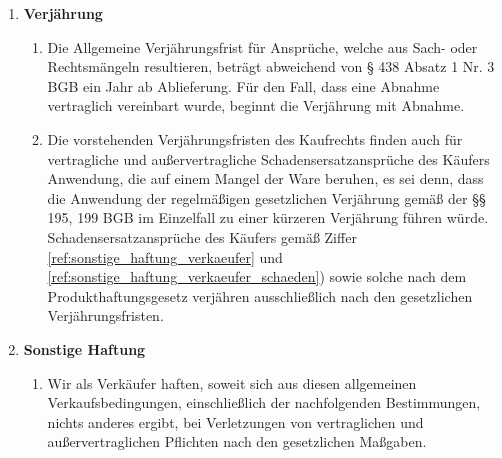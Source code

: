\documentclass[%
    a4paper,%
    10pt,
]{scrartcl}
\begin{document}
\begin{multicols}{2}
\begin{enumerate}
\begin{enumerate}
             \item Der Käufer kann nach den gesetzlichen Vorschriften vom Kaufvertrag zurücktreten oder den Kaufpreis mindern, wenn eine vom Käufer für die Nacherfüllung zu setzende Frist erfolglos abgelaufen ist oder nach den gesetzlichen Vorschriften entbehrlich ist. Für den Fall eines nicht erheblichen Mangels steht dem Käufer jedoch kein Rücktrittsrecht zu.
             \item Ansprüche des Käufers auf Aufwendungsersatz gemäß § 445a Absatz 1 BGB sind ausgeschlossen, es sei denn, dass es sich bei dem letzten Vertrag in der Lieferkette um einen Verbrauchsgüterkauf (§§ 478, 474 BGB) oder um einen Verbrauchervertrag über die Bereitstellung digitaler Produkte (§§ 445c Satz 2, 327 Absatz 5, 327u BGB) handelt.
             \item Schadensersatzansprüche oder Ansprüche auf Ersatz vergeblicher Aufwendungen des Käufers (§ 284 BGB) bestehen auch bei Vorliegen eines Mangels lediglich nach Maßgabe von Ziffer \ref{ref:verjaehrung} und Ziffer \ref{ref:sonstige_haftung}.
            \end{enumerate}
          \item \textbf{Verjährung} \label{ref:verjaehrung}%
            \begin{enumerate}
            \item Die Allgemeine Verjährungsfrist für Ansprüche, welche aus Sach- oder Rechtsmängeln resultieren, beträgt abweichend von § 438 Absatz 1 Nr. 3 BGB ein Jahr ab Ablieferung. Für den Fall, dass eine Abnahme vertraglich vereinbart wurde, beginnt die Verjährung mit Abnahme.
            \item Die vorstehenden Verjährungsfristen des Kaufrechts finden auch für vertragliche und außervertragliche Schadensersatzansprüche des Käufers Anwendung, die auf einem Mangel der Ware beruhen, es sei denn, dass die Anwendung der regelmäßigen gesetzlichen Verjährung gemäß der §§ 195, 199 BGB im Einzelfall zu einer kürzeren Verjährung führen würde. Schadensersatzansprüche des Käufers gemäß Ziffer \ref{ref:sonstige_haftung_verkaeufer} und \ref{ref:sonstige_haftung_verkaeufer_schaeden}) sowie solche nach dem Produkthaftungsgesetz verjähren ausschließlich nach den gesetzlichen Verjährungsfristen.
            \end{enumerate}
          \item \textbf{Sonstige Haftung} \label{ref:sonstige_haftung}%
            \begin{enumerate}
            \item \label{ref:sonstige_haftung_verkaeufer}Wir als Verkäufer haften, soweit sich aus diesen allgemeinen Verkaufsbedingungen, einschließlich der nachfolgenden Bestimmungen, nichts anderes ergibt, bei Verletzungen von vertraglichen und außervertraglichen Pflichten nach den gesetzlichen Maßgaben.

\end{enumerate}
\end{enumerate}
\end{multicols}
\end{document}
